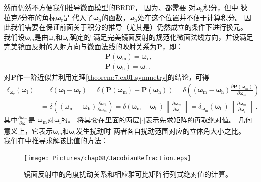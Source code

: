 然而仍然不方便我们推导微面模型的BRDF，
因为、都需要
对${\bm\omega}_{\mathrm{h}}$积分，但中
狄拉克$\delta$分布的角标${\bm\omega}_{\mathrm{r}}$是
代入了${\bm\omega}_{\mathrm{h}}$的函数，${\bm\omega}_{\mathrm{h}}$处在这个位置并不便于计算积分。
因此我们需要在保证前面关于积分的推导（尤其是）仍然成立的条件下进行换元。
我们设${\bm\omega}_{\mathrm{m}}$是由${\bm\omega}_{\mathrm{i}}$和${\bm\omega}_{\mathrm{o}}$确定的
满足完美镜面反射的规范化微面法线方向，并设满足完美镜面反射的入射方向与微面法线的映射关系为$\bm P$，即：
\begin{align}
    {\bm P}({\bm\omega}_{\mathrm{m}})={\bm\omega}_{\mathrm{i}}\, , \\
    {\bm P}({\bm\omega}_{\mathrm{h}})={\bm\omega}_{\mathrm{r}}\, .
\end{align}
对$\bm P$作一阶近似并利用定理\ref{theorem:7.ex01.symmetry}的结论，可得
\begin{align}\label{eq:08ex01-DeltaChangeVar}
    \delta_{{\bm\omega}_{\mathrm{r}}}({\bm\omega}_{\mathrm{i}})
     & =\delta({\bm\omega}_{\mathrm{i}}-{\bm\omega}_{\mathrm{r}})
    =\delta({\bm P}({\bm\omega}_{\mathrm{m}})-{\bm P}({\bm\omega}_{\mathrm{h}}))
    =\displaystyle\delta\left(({\bm\omega}_{\mathrm{m}}-{\bm\omega}_{\mathrm{h}})
    \frac{\partial{\bm P}({\bm\omega}_{\mathrm{m}})}{\partial{\bm\omega}_{\mathrm{m}}}\right)\nonumber \\
     & =\displaystyle\delta\left(({\bm\omega}_{\mathrm{m}}-{\bm\omega}_{\mathrm{h}})
    \frac{\partial{\bm\omega}_{\mathrm{i}}}{\partial{\bm\omega}_{\mathrm{m}}}\right)
    =\delta({\bm\omega}_{\mathrm{m}}-{\bm\omega}_{\mathrm{h}})
    \left\lVert\frac{\partial{\bm\omega}_{\mathrm{m}}}{\partial{\bm\omega}_{\mathrm{i}}}\right\rVert
    =\delta_{{\bm\omega}_{\mathrm{m}}}({\bm\omega}_{\mathrm{h}})
    \left\lVert\frac{\partial{\bm\omega}_{\mathrm{m}}}{\partial{\bm\omega}_{\mathrm{i}}}\right\rVert\, .
\end{align}
其中$\displaystyle\frac{\partial{\bm\omega}_{\mathrm{m}}}{\partial{\bm\omega}_{\mathrm{i}}}$是
${\bm\omega}_{\mathrm{m}}$对${\bm\omega}_{\mathrm{i}}$的。
将其套在里面的两层$|\cdot|$表示先求矩阵的再取绝对值。
几何意义上，它表示${\bm\omega}_{\mathrm{m}}$和${\bm\omega}_{\mathrm{i}}$发生扰动时
两者各自扰动范围对应的立体角大小之比。
我们在中推导求解该比值的方法：
\begin{figure}[htbp]
    \centering
    \texttt{[image: Pictures/chap08/JacobianRefraction.eps]}
    \caption{镜面反射中的角度扰动关系和相应雅可比矩阵行列式绝对值的计算。}
    \label{fig:08ex01-JacobianRefraction}
\end{figure}

